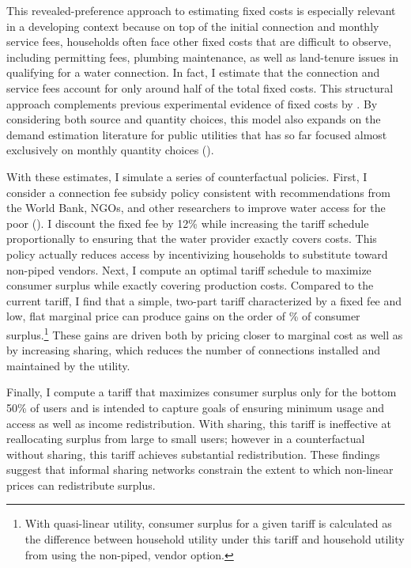 \documentclass[12pt]{article}
\begin{document}
This revealed-preference approach to estimating fixed costs is especially relevant in a developing context because on top of the initial connection and monthly service fees, households often face other fixed costs that are difficult to observe, including permitting fees, plumbing maintenance, as well as land-tenure issues in qualifying for a water connection.  In fact, I estimate that the connection and service fees account for only around half of the total fixed costs.  This structural approach complements previous experimental evidence of fixed costs by \cite{devoto2012happiness}.  By considering both source and quantity choices, this model also expands on the demand estimation literature for public utilities that has so far focused almost exclusively on monthly quantity choices (\cite{diakite2009proposal,mcrae2014infrastructure,olmstead2009reduced,szabo2015value}).  



With these estimates, I simulate a series of counterfactual policies.  First, I consider a connection fee subsidy policy consistent with recommendations from the World Bank, NGOs, and other researchers to improve water access for the poor (\cite{komives2005water,jimenez2014factors,mcintosh2003asian}).  I discount the fixed fee by 12\% while increasing the tariff schedule proportionally to ensuring that the water provider exactly covers costs.  This policy actually reduces access by incentivizing households to substitute toward non-piped vendors.  Next, I compute an optimal tariff schedule to maximize consumer surplus while exactly covering production costs.  Compared to the current tariff, I find that a simple, two-part tariff characterized by a fixed fee and low, flat marginal price can produce gains on the order of \unskip\% of consumer surplus.\footnote{With quasi-linear utility, consumer surplus for a given tariff is calculated as the difference between household utility under this tariff and household utility from using the non-piped, vendor option.}  These gains are driven both by pricing closer to marginal cost as well as by increasing sharing, which reduces the number of connections installed and maintained by the utility.  

Finally, I compute a tariff that maximizes consumer surplus only for the bottom 50\% of users and is intended to capture goals of ensuring minimum usage and access as well as income redistribution.  With sharing, this tariff is ineffective at reallocating surplus from large to small users; however in a counterfactual without sharing, this tariff achieves substantial redistribution.  These findings suggest that informal sharing networks constrain the extent to which non-linear prices can redistribute surplus.
\end{document}
